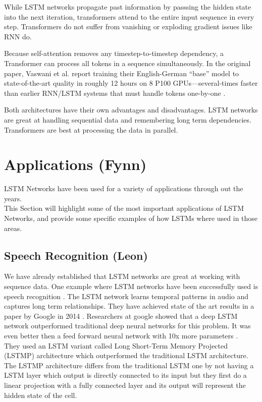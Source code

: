 \documentclass[twoside,a4paper,10pt,DIV=12,BCOR=12mm]{scrartcl}
\begin{document}
While LSTM networks propagate past information by passsing the hidden state into the next iteration, transformers attend to the entire input sequence in every
step. Transformers do not suffer from vanishing or exploding gradient issues like RNN do.


Because self-attention removes any timestep-to-timestep dependency, a Transformer can process all tokens in a sequence simultaneously. 
In the original paper, Vaswani et al. report training their English-German “base” model to state-of-the-art quality in roughly 
12 hours on 8 P100 GPUs—several-times faster than earlier RNN/LSTM systems that must handle tokens one-by-one \cite{vaswani2017attention}.


Both architectures have their own advantages and disadvantages. LSTM networks are great at handling sequential data and 
remembering long term dependencies. Transformers are best at processing the data in parallel.


\section{Applications (Fynn)}

LSTM Networks have been used for a variety of applications through out the years.\\
This Section will highlight some of the most important applications of LSTM Networks, and provide some specific examples of how LSTMs where used in those areas.

\subsection{Speech Recognition (Leon)}

We have already established that LSTM networks are great at working with sequence data. One example where LSTM networks
have been successfully used is speech recognition \cite{Graves04}. The LSTM network learns temporal patterns in audio and captures long 
term relationships. They have achieved state of the art results in a paper by Google in 2014 \cite{sak2014longshorttermmemorybased}.
Researchers at google showed that a deep LSTM network outperformed traditional deep neural networks for this problem.
It was even better then a feed forward neural network with 10x more parameters \cite{sak2014longshorttermmemorybased}.\\


They used an LSTM variant called Long Short-Term Memory Projected (LSTMP) architecture \cite{sak2014longshorttermmemorybased} which
outperformed the traditional LSTM architecture. The LSTMP architecture differs from the traditional LSTM one by not having a LSTM layer
which output is directly connected to its input but they first do a linear projection with a fully connected layer and its output will represent the 
hidden state of the cell.
\end{document}
